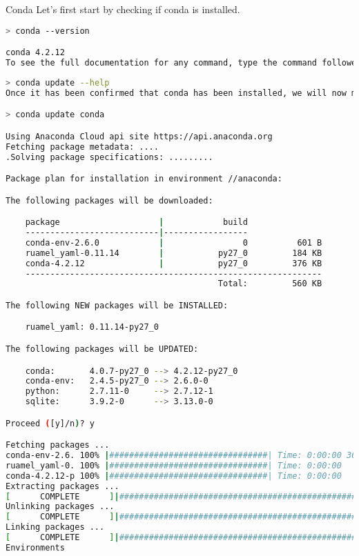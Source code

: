 Conda
Let's first start by checking if conda is installed.

\begin{lstlisting}[language=bash]
> conda --version

conda 4.2.12
To see the full documentation for any command, type the command followed by --help. For example, to learn about the conda update command:
\end{lstlisting}


\begin{lstlisting}[language=bash]
> conda update --help
Once it has been confirmed that conda has been installed, we will now make sure that it is up to date.

> conda update conda

Using Anaconda Cloud api site https://api.anaconda.org
Fetching package metadata: ....
.Solving package specifications: .........

Package plan for installation in environment //anaconda:

The following packages will be downloaded:

    package                    |            build
    ---------------------------|-----------------
    conda-env-2.6.0            |                0          601 B
    ruamel_yaml-0.11.14        |           py27_0         184 KB
    conda-4.2.12               |           py27_0         376 KB
    ------------------------------------------------------------
                                           Total:         560 KB

The following NEW packages will be INSTALLED:

    ruamel_yaml: 0.11.14-py27_0

The following packages will be UPDATED:

    conda:       4.0.7-py27_0 --> 4.2.12-py27_0
    conda-env:   2.4.5-py27_0 --> 2.6.0-0
    python:      2.7.11-0     --> 2.7.12-1
    sqlite:      3.9.2-0      --> 3.13.0-0

Proceed ([y]/n)? y

Fetching packages ...
conda-env-2.6. 100% |################################| Time: 0:00:00 360.78 kB/s
ruamel_yaml-0. 100% |################################| Time: 0:00:00   5.53 MB/s
conda-4.2.12-p 100% |################################| Time: 0:00:00   5.84 MB/s
Extracting packages ...
[      COMPLETE      ]|###################################################| 100%
Unlinking packages ...
[      COMPLETE      ]|###################################################| 100%
Linking packages ...
[      COMPLETE      ]|###################################################| 100%
Environments
\end{lstlisting}



